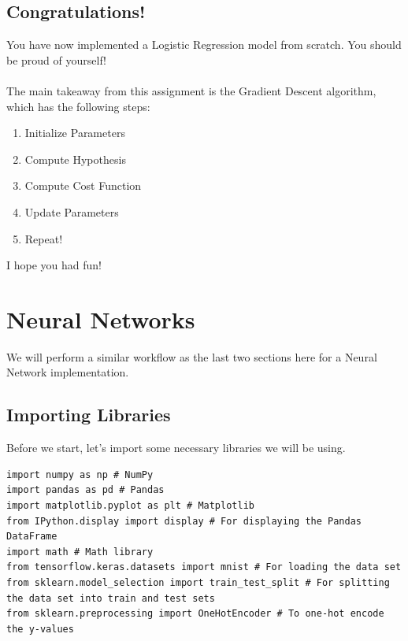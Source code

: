 \documentclass{article}
\begin{document}
\subsection{Congratulations!}
You have now implemented a Logistic Regression model from scratch. You should be proud of yourself!
\\
\\
The main takeaway from this assignment is the Gradient Descent algorithm, which has the following steps:
\begin{enumerate}
    \item Initialize Parameters
    \item Compute Hypothesis
    \item Compute Cost Function
    \item Update Parameters
    \item Repeat!
\end{enumerate}
I hope you had fun!

\section{Neural Networks}
We will perform a similar workflow as the last two sections here for a Neural Network implementation.
\subsection{Importing Libraries}
Before we start, let's import some necessary libraries we will be using.
\begin{lstlisting}
import numpy as np # NumPy
import pandas as pd # Pandas
import matplotlib.pyplot as plt # Matplotlib
from IPython.display import display # For displaying the Pandas DataFrame
import math # Math library
from tensorflow.keras.datasets import mnist # For loading the data set
from sklearn.model_selection import train_test_split # For splitting the data set into train and test sets
from sklearn.preprocessing import OneHotEncoder # To one-hot encode the y-values
\end{lstlisting}
\end{document}

